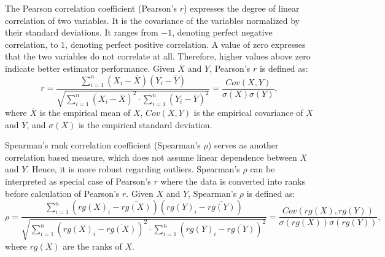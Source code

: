 The Pearson correlation coefficient (Pearson's $r$) expresses the degree of linear correlation of two variables. It is the covariance of the variables normalized by their standard deviations. It ranges from $-1$, denoting perfect negative correlation, to $1$, denoting perfect positive correlation. A value of zero expresses that the two variables do not correlate at all. Therefore, higher values above zero indicate better estimator performance. Given $X$ and $Y$, Pearson's $r$ is defined as:
\begin{equation}
r = \frac{\sum_{i=1}^{n}(X_i - \overline{X})(Y_i - \overline{Y})}{\sqrt{\sum_{i=1}^{n}(X_i - \overline{X})^2 \cdot \sum_{i=1}^{n}(Y_i - \overline{Y})^2}} = \frac{Cov(X, Y)}{\sigma(X) \sigma(Y)},
\end{equation}
where $\overline{X}$ is the empirical mean of $X$, $Cov(X, Y)$ is the empirical covariance of $X$ and $Y$, and $\sigma(X)$ is the empirical standard deviation.

Spearman's rank correlation coefficient (Spearman's $\rho$) serves as another correlation based measure, which does not assume linear dependence between $X$ and $Y$. Hence, it is more robust regarding outliers. Spearman's $\rho$ can be interpreted as special case of Pearson's $r$ where the data is converted into ranks before calculation of Pearson's $r$. Given $X$ and $Y$, Spearman's $\rho$ is defined as:
\begin{equation}
\rho = \frac{\sum_{i=1}^{n}(rg(X)_i - \overline{rg(X)})(rg(Y)_i - \overline{rg(Y)})}{\sqrt{\sum_{i=1}^{n}(rg(X)_i - \overline{rg(X)})^2 \cdot \sum_{i=1}^{n}(rg(Y)_i - \overline{rg(Y)})^2}} = \frac{Cov({rg(X)}, {rg(Y)})}{\sigma({rg(X)})\sigma({rg(Y)})},
\end{equation}
where $rg(X)$ are the ranks of $X$. 



